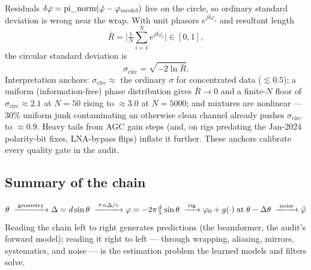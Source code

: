 Residuals $\delta\varphi = \operatorname{pi\_norm}(\hat\varphi - \varphi_{\mathrm{model}})$
live on the circle, so ordinary standard deviation is wrong near the wrap.
With unit phasors $e^{j\delta\varphi_i}$ and resultant length
\[
\bar R = \Big| \tfrac{1}{N}\sum_{i=1}^{N} e^{j\delta\varphi_i} \Big|
\in [0, 1],
\]
the circular standard deviation is
\[
\sigma_{\mathrm{circ}} = \sqrt{-2\ln \bar R}.
\]
Interpretation anchors: $\sigma_{\mathrm{circ}} \approx$ the ordinary
$\sigma$ for concentrated data ($\lesssim 0.5$); a uniform (information-free)
phase distribution gives $\bar R \to 0$ and a finite-$N$ floor of
$\sigma_{\mathrm{circ}} \approx 2.1$ at $N = 50$ rising to $\approx 3.0$ at
$N = 5000$; and mixtures are nonlinear --- 30\% uniform junk contaminating an
otherwise clean channel already pushes $\sigma_{\mathrm{circ}}$ to
$\approx 0.9$. Heavy tails from AGC gain steps (and, on rigs predating the
Jan-2024 polarity-bit fixes, LNA-bypass flips) inflate it further. These anchors calibrate every quality gate
in the audit.

\subsection{Summary of the chain}

\[
\theta
\;\xrightarrow{\;\text{geometry}\;}
\Delta = d\sin\theta
\;\xrightarrow{\;\tau = \Delta/c\;}
\varphi = -2\pi\tfrac{d}{\lambda}\sin\theta
\;\xrightarrow{\;\text{rig}\;}
\varphi_0 + g(\cdot)\;\text{at}\;\theta - \Delta\theta
\;\xrightarrow{\;\text{noise}\;}
\hat\varphi
\]
Reading the chain left to right generates predictions (the beamformer, the
audit's forward model); reading it right to left --- through wrapping,
aliasing, mirrors, systematics, and noise --- is the estimation problem the
learned models and filters solve.
